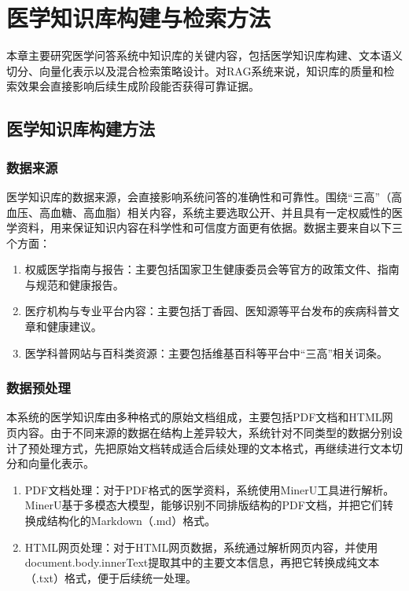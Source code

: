 \chapter{医学知识库构建与检索方法}

本章主要研究医学问答系统中知识库的关键内容，包括医学知识库构建、文本语义切分、向量化表示以及混合检索策略设计。对RAG系统来说，知识库的质量和检索效果会直接影响后续生成阶段能否获得可靠证据。

\section{医学知识库构建方法}

\subsection{数据来源}

医学知识库的数据来源，会直接影响系统问答的准确性和可靠性。围绕“三高”（高血压、高血糖、高血脂）相关内容，系统主要选取公开、并且具有一定权威性的医学资料，用来保证知识内容在科学性和可信度方面更有依据。数据主要来自以下三个方面：

\begin{enumerate}[label =(\arabic*)]

    \item 权威医学指南与报告：主要包括国家卫生健康委员会等官方的政策文件、指南与规范和健康报告。
    \item 医疗机构与专业平台内容：主要包括丁香园、医知源等平台发布的疾病科普文章和健康建议。
    \item 医学科普网站与百科类资源：主要包括维基百科等平台中“三高”相关词条。

\end{enumerate}

\subsection{数据预处理}

本系统的医学知识库由多种格式的原始文档组成，主要包括PDF文档和HTML网页内容。由于不同来源的数据在结构上差异较大，系统针对不同类型的数据分别设计了预处理方式，先把原始文档转成适合后续处理的文本格式，再继续进行文本切分和向量化表示。
\begin{enumerate}[label =(\arabic*)]

    \item PDF文档处理：对于PDF格式的医学资料，系统使用MinerU工具进行解析。MinerU基于多模态大模型，能够识别不同排版结构的PDF文档，并把它们转换成结构化的Markdown（.md）格式。
    \item HTML网页处理：对于HTML网页数据，系统通过解析网页内容，并使用document.body.innerText提取其中的主要文本信息，再把它转换成纯文本（.txt）格式，便于后续统一处理。

\end{enumerate}

